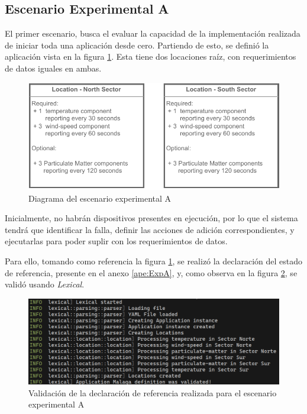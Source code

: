 \subsection{Escenario Experimental A} \label{sec:EscenarioExperimentalA}

El primer escenario, busca el evaluar la capacidad de la implementación realizada de iniciar toda una aplicación desde cero. Partiendo de esto, se definió la aplicación vista en la figura \ref{fig:ExpA}. Esta tiene dos locaciones raíz, con requerimientos de datos iguales en ambas.

\begin{figure}[H]
    \centering
    \caption{Diagrama del escenario experimental A}
    \label{fig:ExpA}
    \includegraphics[width=0.8\linewidth]{images/ScenarioA.pdf}
    \vspace{-4mm}
\end{figure}

Inicialmente, no habrán dispositivos presentes en ejecución, por lo que el sistema tendrá que identificar la falla, definir las acciones de adición correspondientes, y ejecutarlas para poder suplir con los requerimientos de datos.

Para ello, tomando como referencia la figura \ref{fig:ExpA}, se realizó la declaración del estado de referencia, presente en el anexo \ref{ape:ExpA}, y, como observa en la figura \ref{fig:ValidA}, se validó usando \textit{Lexical}.

\begin{figure}[H]
    \centering
    \caption{Validación de la declaración de referencia realizada para el escenario experimental A}
    \label{fig:ValidA}
    \includegraphics[width=0.7\linewidth]{images/ValidationLexicalA.png}
    \vspace{-4mm}
\end{figure}

